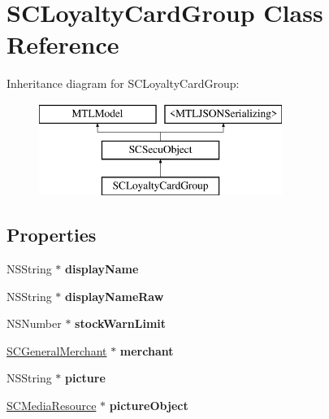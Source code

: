 \hypertarget{interface_s_c_loyalty_card_group}{}\section{S\+C\+Loyalty\+Card\+Group Class Reference}
\label{interface_s_c_loyalty_card_group}
Inheritance diagram for S\+C\+Loyalty\+Card\+Group\+:\begin{figure}[H]
\begin{center}
\leavevmode
\includegraphics[height=3.000000cm]{interface_s_c_loyalty_card_group}
\end{center}
\end{figure}
\subsection*{Properties}
\begin{DoxyCompactItemize}
\item 
N\+S\+String $\ast$ {\bfseries display\+Name}\hypertarget{interface_s_c_loyalty_card_group_ae7a185b5f0dc05319b15263574a1806d}{}\label{interface_s_c_loyalty_card_group_ae7a185b5f0dc05319b15263574a1806d}

\item 
N\+S\+String $\ast$ {\bfseries display\+Name\+Raw}\hypertarget{interface_s_c_loyalty_card_group_af303a0ea517fb5790551ed53cad9a973}{}\label{interface_s_c_loyalty_card_group_af303a0ea517fb5790551ed53cad9a973}

\item 
N\+S\+Number $\ast$ {\bfseries stock\+Warn\+Limit}\hypertarget{interface_s_c_loyalty_card_group_afde87e3ad03de851d6e85bd8670d452a}{}\label{interface_s_c_loyalty_card_group_afde87e3ad03de851d6e85bd8670d452a}

\item 
\hyperlink{interface_s_c_general_merchant}{S\+C\+General\+Merchant} $\ast$ {\bfseries merchant}\hypertarget{interface_s_c_loyalty_card_group_a133aa2875a1cfdc0a121a8d1aaffc702}{}\label{interface_s_c_loyalty_card_group_a133aa2875a1cfdc0a121a8d1aaffc702}

\item 
N\+S\+String $\ast$ {\bfseries picture}\hypertarget{interface_s_c_loyalty_card_group_aba89c6667d7f14bb667788e6c872d328}{}\label{interface_s_c_loyalty_card_group_aba89c6667d7f14bb667788e6c872d328}

\item 
\hyperlink{interface_s_c_media_resource}{S\+C\+Media\+Resource} $\ast$ {\bfseries picture\+Object}\hypertarget{interface_s_c_loyalty_card_group_acae444e245c3480b9799bae1a4f0c852}{}\label{interface_s_c_loyalty_card_group_acae444e245c3480b9799bae1a4f0c852}

\end{DoxyCompactItemize}
